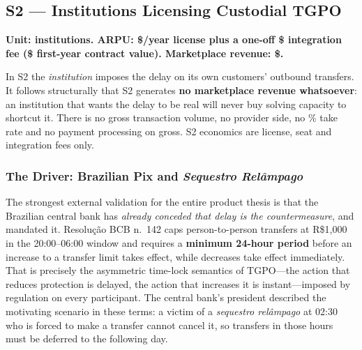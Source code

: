 
\subsection{S2 --- Institutions Licensing Custodial TGPO}

\textbf{Unit: institutions. ARPU: \$\numint{\arpuSegTwoAnnualLicence}/year license plus
a one-off \$\numint{\arpuSegTwoIntegrationFee} integration fee
(\$\numint{\arpuSegTwoYearOneContract} first-year contract value).
Marketplace revenue: \$\numint{\arpuSegTwoMarketplaceRevenue}.}

In S2 the \emph{institution} imposes the delay on its own customers' outbound
transfers. It follows structurally that S2 generates \textbf{no marketplace revenue
whatsoever}: an institution that wants the delay to be real will never buy solving
capacity to shortcut it. There is no gross transaction volume, no provider side, no
\numint{\markPlatformFeePercent}\% take rate and no payment processing on gross.
S2 economics are license, seat and integration fees only.

\subsubsection*{The Driver: Brazilian Pix and \textit{Sequestro Rel\^{a}mpago}}

The strongest external validation for the entire product thesis is that the Brazilian
central bank has \emph{already conceded that delay is the countermeasure}, and
mandated it. Resolu\c{c}\~{a}o BCB n.\ 142 caps person-to-person transfers at
R\$1{,}000 in the 20:00--06:00 window and requires a \textbf{minimum 24-hour period}
before an increase to a transfer limit takes effect, while decreases take effect
immediately\cite{bcb2021res142}. That is precisely the asymmetric time-lock semantics
of TGPO---the action that reduces protection is delayed, the action that increases it
is instant---imposed by regulation on every participant. The central bank's president
described the motivating scenario in these terms: a victim of a
\textit{sequestro rel\^{a}mpago} at 02:30 who is forced to make a transfer cannot cancel
it, so transfers in those hours must be deferred to the following
day\cite{cnnbrasil2021pix}.

